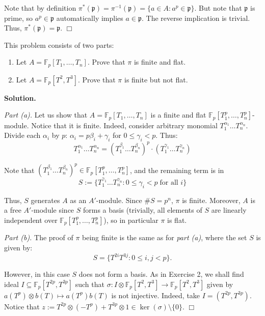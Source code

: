 \documentclass{template}
\newcommand{\qedwhite}{\hfill \ensuremath{\Box}}
\begin{document}
Note that by definition $\pi^*(\mathfrak{p}) = \pi^{-1}(\mathfrak{p}) = \{a \in
A: a^p \in \mathfrak{p}\}$. But note that $\mathfrak{p}$ is prime, so $a^p \in
\mathfrak{p}$ automatically implies $a \in \mathfrak{p}$. The reverse
implication is trivial. Thus, $\pi^*(\mathfrak{p}) = \mathfrak{p}$. \qedwhite


\begin{problem}[Exercise 4]
    This problem consists of two parts:
    \begin{enumerate}
        \item[(a)] Let $A=\mathbb{F}_p[T_1,\dots,T_n]$. Prove that $\pi$ is finite and flat.
        \item[(b)] Let $A=\mathbb{F}_p[T^2,T^3]$. Prove that $\pi$ is finite but not flat. 
    \end{enumerate}
\end{problem}

\textbf{Solution.} 

\textit{Part (a).} Let us show that $A=\mathbb{F}_p[T_1,\dots,T_n]$ is a finite
and flat $\mathbb{F}_p[T_1^p,\dots,T_n^p]$-module. Notice that it is finite.
Indeed, consider arbitrary monomial $T_1^{\alpha_1}\dots T_n^{\alpha_n}$. Divide
each $\alpha_i$ by $p$: $\alpha_i = p\beta_i + \gamma_i$ for $0 \leq \gamma_i <
p$. Thus:
\begin{equation*}
    T_1^{\alpha_1}\ldots T_n^{\alpha_n} = (T_1^{\beta_1}\ldots T_n^{\beta_n})^p \cdot (T_1^{\gamma_1}\ldots T_n^{\gamma_n})
\end{equation*}

Note that $(T_1^{\beta_1}\ldots T_n^{\beta_n})^p \in
\mathbb{F}_p[T_1^p,\ldots,T_n^p]$, and the remaining term is in
\begin{equation*}
    S := \{T_1^{\gamma_1}\ldots T_n^{\gamma_n}: 0 \leq \gamma_i < p \; \text{for all $i$}\}
\end{equation*}

Thus, $S$ generates $A$ as an $A'$-module. Since $\#S = p^n$, $\pi$ is finite.
Moreover, $A$ is a free $A'$-module since $S$ forms a basis (trivially, all
elements of $S$ are linearly independent over
$\mathbb{F}_p[T_1^p,\dots,T_n^p]$), so in particular $\pi$ is flat.

\textit{Part (b).} The proof of $\pi$ being finite is the same as for 
\textit{part (a)}, where the set $S$ is given by:
\begin{equation*}
    S = \{T^{2i}T^{3j}: 0 \leq i,j < p\}.
\end{equation*}

However, in this case $S$ does not form a basis. As in Exercise 2, we shall find
ideal $I \subseteq \mathbb{F}_p[T^{2p},T^{3p}]$ such that $\sigma: I \otimes
\mathbb{F}_p[T^2,T^3] \to \mathbb{F}_p[T^2,T^3]$ given by $a(T^p) \otimes b(T)
\mapsto a(T^p)b(T)$ is not injective. Indeed, take $I=(T^{2p},T^{3p})$. Notice
that $z := T^{2p} \otimes (-T^p) + T^{3p} \otimes 1 \in \ker(\sigma)
\setminus \{0\}$. \qedwhite
\end{document}
